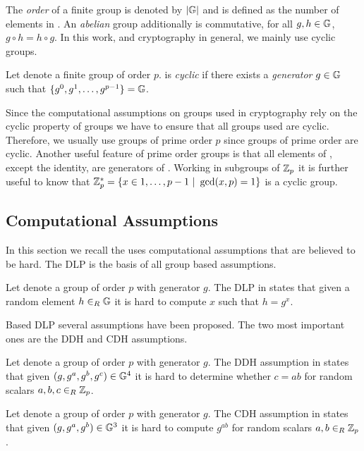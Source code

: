 \noindent
The \emph{order} of a finite group \GG is denoted by $|\mathbb{G}|$ and is defined as the number of elements in \GG.
An \emph{abelian} group additionally is commutative, \ie for all $g,h\in\mathbb{G}$, $g\circ h=h\circ g$.
In this work, and cryptography in general, we mainly use cyclic groups.

\begin{definition}\label{def:cyclicgroups}
Let \GG denote a finite group of order $p$.
\GG is \emph{cyclic} if there exists a \emph{generator} $g\in\mathbb{G}$ such that $\{g^0,g^1,\dots,g^{p-1}\}=\mathbb{G}$.
\eod
\end{definition}

\noindent
Since the computational assumptions on groups used in cryptography rely on the cyclic property of groups we have to ensure that all groups used are cyclic.
Therefore, we usually use groups of prime order $p$ since groups of prime order are cyclic.
Another useful feature of prime order groups is that all elements of \GG, except the identity, are generators of \GG.
Working in subgroups of $\mathbb{Z}_p$ it is further useful to know that $\mathbb{Z}^\ast_p=\{x\in{1,\dots,p-1}~|~\gcd(x,p)=1\}$ is a cyclic group.



\subsection{Computational Assumptions}
In this section we recall the uses computational assumptions that are believed to be hard.
The \ac{DLP} is the basis of all group based assumptions.

\begin{definition}\label{def:dlp}
Let \GG denote a group of order $p$ with generator $g$.
The \ac{DLP} in \GG states that given a random element $h\in_R\mathbb{G}$ it is hard to compute $x$ such that $h=g^x$.
\eod
\end{definition}

\noindent
Based \ac{DLP} several assumptions have been proposed.
The two most important ones are the \ac{DDH} and \ac{CDH} assumptions.

\begin{definition}\label{def:ddh}
Let \GG denote a group of order $p$ with generator $g$.
The \ac{DDH} assumption in \GG states that given $(g,g^a,g^b,g^c)\in\mathbb{G}^4$ it is hard to determine whether $c=ab$ for random scalars $a,b,c\in_R\mathbb{Z}_p$.
\eod
\end{definition}

\begin{definition}\label{def:cdh}
Let \GG denote a group of order $p$ with generator $g$.
The \ac{CDH} assumption in \GG states that given $(g,g^a,g^b)\in\mathbb{G}^3$ it is hard to compute $g^{ab}$ for random scalars $a,b\in_R\mathbb{Z}_p$.
\eod
\end{definition}

